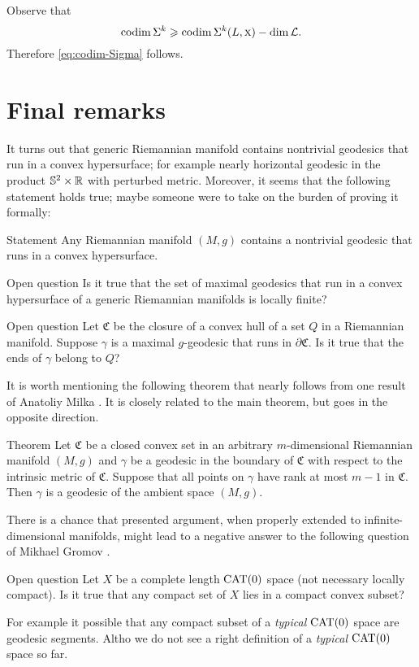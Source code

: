 \documentclass[a4paper,10pt]{article}
\begin{document}
Observe that 
\[\operatorname{\rm codim}\Sigma^k\geqslant \operatorname{\rm codim}\Sigma^k(L,\text{\sc{x}})-\operatorname{\rm dim}\mathcal{L}.\]
Therefore \ref{eq:codim-Sigma} follows.
\qeds

\section{Final remarks}

It turns out that generic Riemannian manifold contains nontrivial geodesics that run in a convex hypersurface;
for example nearly horizontal geodesic in the product $\mathbb{S}^2\times \mathbb{R}$ with perturbed metric. 
Moreover, it seems that the following statement holds true; maybe someone were to take on the burden of proving it formally:

\begin{thm}{Statement}
Any Riemannian manifold $(M,g)$ contains a nontrivial geodesic  that runs in a convex hypersurface.
\end{thm}

\begin{thm}{Open question}
Is it true that the set of maximal geodesics that run in a convex hypersurface of a generic Riemannian manifolds is locally finite?
\end{thm}

\begin{thm}{Open question}
Let $\mathfrak{C}$ be the closure of a convex hull of a set $Q$ in a Riemannian manifold.
Suppose $\gamma$ is a maximal $g$-geodesic that runs in $\partial \mathfrak{C}$.
Is it true that the ends of $\gamma$ belong to $Q$?
\end{thm}

It is worth mentioning the following theorem that nearly follows from one result of Anatoliy Milka \cite[§~4]{milka}.
It is closely related to the main theorem, but goes in the opposite direction.

\begin{thm}{Theorem}
Let $\mathfrak{C}$ be a closed convex set in an arbitrary $m$-dimensional Riemannian manifold $(M,g)$ and $\gamma$ be a geodesic in the boundary of $\mathfrak{C}$ with respect to the intrinsic metric of $\mathfrak {C}$.
Suppose that all points on $\gamma$ have rank at most $m-1$ in $\mathfrak{C}$.
Then $\gamma$ is a geodesic of the ambient space $(M,g)$.
\end{thm}

There is a chance that presented argument, when properly extended to infinite-dimensional manifolds, might lead to a negative answer to the following question of Mikhael Gromov \cite[6.B\textsubscript{1}(f)]{gromov-1993}.

\begin{thm}{Open question}
Let $X$ be a complete length $\operatorname{\rm CAT}(0)$ space (not necessary locally compact).
Is it true that any compact set of $X$ lies in a compact convex subset?
\end{thm}

For example it possible that any compact subset of a \emph{typical} $\operatorname{\rm CAT}(0)$ space are geodesic segments.
Altho we do not see a right definition of a \emph{typical} $\operatorname{\rm CAT}(0)$ space so far.

{\sloppy
\printbibliography[heading=bibintoc]
\fussy
}
\end{document}
